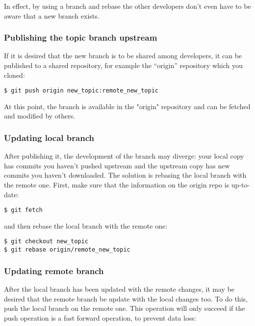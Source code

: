 \documentclass[10p]{article}
\theoremstyle{definition}
\begin{document}
In effect, by using a branch and rebase the other developers don't even have to be aware that a new branch exists.

\subsubsection*{Publishing the topic branch upstream}

If it is desired that the new branch is to be shared among developers, it can be published to a shared repository, for example the ``origin'' repository which you cloned:

\begin{lstlisting}
$ git push origin new_topic:remote_new_topic
\end{lstlisting}

At this point, the branch is available in the "origin" repository and can be fetched and modified by others.

\subsubsection*{Updating local branch}

After publishing it, the development of the branch may diverge: your local copy has commits you haven't pushed upstream and the upstream copy has new commits you haven't downloaded. The solution is rebasing the local branch with the remote one. First, make sure that the information on the origin repo is up-to-date:

\begin{lstlisting}
$ git fetch
\end{lstlisting}

and then rebase the local branch with the remote one:

\begin{lstlisting}
$ git checkout new_topic
$ git rebase origin/remote_new_topic
\end{lstlisting}

\subsubsection*{Updating remote branch}

After the local branch has been updated with the remote changes, it may be desired that the remote branch be update with the local changes too. To do this, push the local branch on the remote one. This operation will only succeed if the push operation is a fast forward operation, to prevent data loss:
\end{document}

